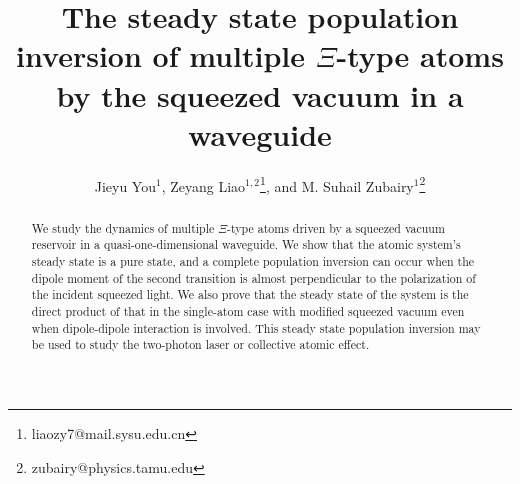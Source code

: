 \documentclass[aps,showpacs,twocolumn,twoside,groupedaddress]{revtex4}
\begin{document}
\title{The steady state population inversion of multiple $\Xi$-type atoms by the squeezed vacuum in a waveguide}
\author{Jieyu You$^{1}$, Zeyang Liao$^{1,2}$\footnote{liaozy7@mail.sysu.edu.cn}, and M. Suhail Zubairy$^{1}$\footnote{zubairy@physics.tamu.edu}}

\begin{abstract}
We study the dynamics of multiple $\Xi$-type atoms driven by a squeezed vacuum reservoir in a quasi-one-dimensional waveguide. We show that the atomic system's steady state is a pure state, and a complete population inversion can occur when the dipole moment of the second transition is almost perpendicular to the polarization of the incident squeezed light. We also prove that the steady state of the system is the direct product of that in the single-atom case with modified squeezed vacuum even when dipole-dipole interaction is involved. This steady state population inversion may be used to study the two-photon laser or collective atomic effect.
\end{abstract}
\maketitle 
\end{document}
